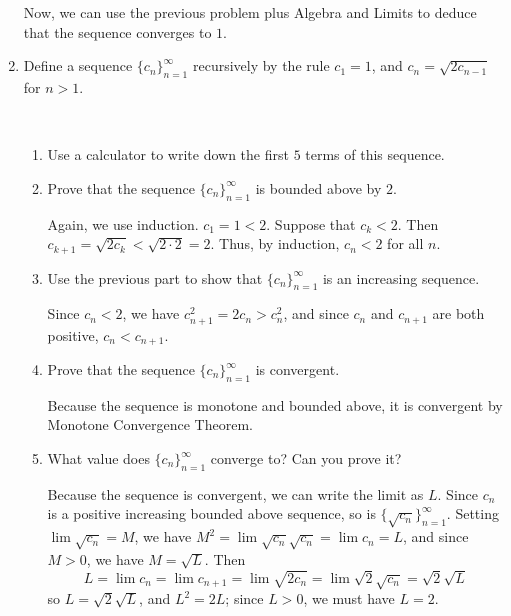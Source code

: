\documentclass[12pt]{amsart}
\numberwithin{equation}{section}
\theoremstyle{plain} %
\theoremstyle{definition}
\theoremstyle{remark}
\begin{document}
\begin{enumerate}
\begin{framed}
Now, we can use the previous problem plus Algebra and Limits to deduce that the sequence converges to $1$.
\end{framed}

\item Define a sequence $\{ c_n\}_{n=1}^\infty$ recursively by the rule $c_1=1$, and $\displaystyle c_{n} = \sqrt{2 c_{n-1}}$ for $n>1$. 

\

\begin{enumerate}
\item Use a calculator to write down the first $5$ terms of this sequence.


\item Prove that the sequence $\{c_n\}_{n=1}^\infty$ is bounded above by $2$.

\begin{framed}
Again, we use induction. $c_1=1<2$. Suppose that $c_k<2$. Then $c_{k+1} = \sqrt{2 c_k} < \sqrt{2 \cdot 2} = 2$. Thus, by induction, $c_n<2$ for all $n$.
\end{framed}


\item Use the previous part to show that $\{c_n\}_{n=1}^\infty$ is an increasing sequence.

\begin{framed}
Since $c_n<2$, we have $c_{n+1}^2 = 2 c_n > c_n^2$, and since $c_n$ and $c_{n+1}$ are both positive, $c_n < c_{n+1}$.
\end{framed}

\item Prove that the sequence $\{c_n\}_{n=1}^\infty$ is convergent.

\begin{framed}
Because the sequence is monotone and bounded above, it is convergent by Monotone Convergence Theorem.
\end{framed}

\item What value does $\{c_n\}_{n=1}^\infty$ converge to? Can you prove it?

\begin{framed}
Because the sequence is convergent, we can write the limit as $L$. Since $c_n$ is a positive increasing bounded above sequence, so is $\{ \sqrt{c_n} \}_{n=1}^\infty$. Setting $\lim \sqrt{c_n} = M$, we have $M^2 = \lim \sqrt{c_n} \sqrt{c_n} = \lim  c_n = L$, and since $M>0$, we have $M=\sqrt{L}$. Then 
\[ L = \lim c_n = \lim c_{n+1} = \lim \sqrt{2 c_n} = \lim \sqrt{2} \sqrt{c_n} = \sqrt{2} \sqrt{L}\]
so $L= \sqrt{2} \sqrt{L}$, and $L^2 = 2L$; since $L>0$, we must have $L=2$.
\end{framed}
\end{enumerate}

\end{enumerate}
\end{document}
